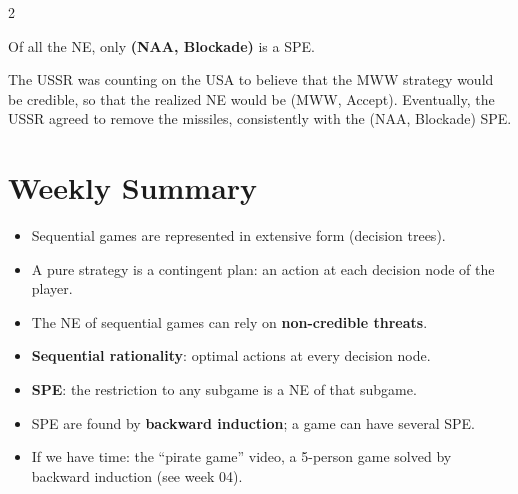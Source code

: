 \documentclass[a4paper,9pt]{extarticle}
\begin{document}
\begin{multicols}{2}
\begin{important}

Of all the NE, only \textbf{(NAA, Blockade)} is a SPE.

The USSR was counting on the USA to believe that the MWW strategy would be credible, so that
the realized NE would be (MWW, Accept). Eventually, the USSR agreed to remove the missiles,
consistently with the (NAA, Blockade) SPE.

\end{important}



\section{Weekly Summary}


\begin{summary}

\begin{itemize}

\item Sequential games are represented in extensive form (decision trees).

\item A pure strategy is a contingent plan: an action at each decision node of the player.

\item The NE of sequential games can rely on \textbf{non-credible threats}.

\item \textbf{Sequential rationality}: optimal actions at every decision node.

\item \textbf{SPE}: the restriction to any subgame is a NE of that subgame.

\item SPE are found by \textbf{backward induction}; a game can have several SPE.

\item If we have time: the ``pirate game'' video, a 5-person game solved by backward
induction (see week 04).

\end{itemize}

\end{summary}



\end{multicols}
\end{document}
